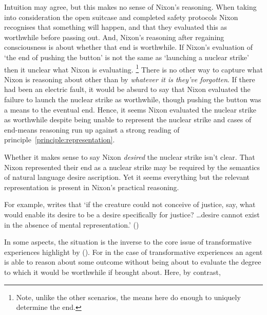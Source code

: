 \documentclass[10pt]{article}
\begin{document}
Intuition may agree, but this makes no sense of Nixon's reasoning.
When taking into consideration the open suitcase and completed safety protocols Nixon recognises that something will happen, and that they evaluated this as worthwhile before passing out.
And, Nixon's reasoning after regaining consciousness is about whether that end is worthwhile.
If Nixon's evaluation of `the end of pushing the button' is not the same as `launching a nuclear strike' then it unclear what Nixon is evaluating.\nolinebreak
\footnote{Note, unlike the other scenarios, the means here do enough to uniquely determine the end.}
There is no other way to capture what Nixon is reasoning about other than by \emph{whatever it is they've forgotten}.
If there had been an electric fault, it would be absurd to say that Nixon evaluated the failure to launch the nuclear strike as worthwhile, though pushing the button was a means to the eventual end.
Hence, it seems Nixon evaluated the nuclear strike as worthwhile despite being unable to represent the nuclear strike and cases of end-means reasoning run up against a strong reading of principle~\ref{principle:representation}.

Whether it makes sense to say Nixon \emph{desired} the nuclear strike isn't clear.
That Nixon represented their end as a nuclear strike may be required by the semantics of natural language desire ascription.
Yet it seems everything but the relevant representation is present in Nixon's practical reasoning.




\newpage








For example, \citeauthor{Schroeder:2004aa} writes that `if the creature could not conceive of justice, say, what would enable its desire to be a desire speciﬁcally for justice?
\dots desire cannot exist in the absence of mental representation.' (\citeauthor[132]{Schroeder:2004aa})







In some aspects, the situation is the inverse to the core issue of transformative experiences highlight by \citeauthor{Paul:2014aa} (\citeyear{Paul:2014aa}).
For in the case of transformative experiences an agent is able to reason about some outcome without being about to evaluate the degree to which it would be worthwhile if brought about.
Here, by contrast, 
\end{document}
